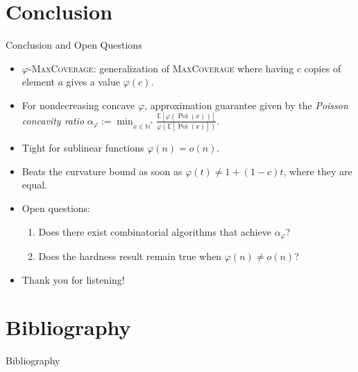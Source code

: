 \documentclass{beamer}
\theoremstyle{definition}
\theoremstyle{remark}
\DeclareMathOperator{\Poi}{\text{Poi}}
\begin{document}
\appendix
\section{Conclusion}
\begin{frame}{Conclusion and Open Questions}
  \begin{itemize}
  \item $\varphi$-\textsc{MaxCoverage}: generalization of \textsc{MaxCoverage} where having $c$ copies of element $a$ gives a value $\varphi(c)$.
  \item For nondecreasing concave $\varphi$, approximation guarantee given by the \emph{Poisson concavity ratio} $\alpha_{\varphi} := \min_{x \in \mathbb{N^*}} \frac{\mathbb{E}[\varphi(\Poi(x))]}{\varphi(\mathbb{E}[\Poi(x)])}$.
  \item Tight for sublinear functions $\varphi(n)=o(n)$.
  \item Beats the curvature bound as soon as $\varphi(t)\not=1+(1-c)t$, where they are equal.

    \pause
    \bigskip
    
    \item Open questions:
      \begin{enumerate}
      \item Does there exist combinatorial algorithms that achieve $\alpha_{\varphi}$?
      \item Does the hardness result remain true when $\varphi(n) \not= o(n)$?
      \end{enumerate}
      \bigskip
      \pause
      \item Thank you for listening!
  \end{itemize}
\end{frame}

\section{Bibliography}
\begin{frame}[allowframebreaks]{Bibliography}
  
  
\end{frame}

\end{document}
